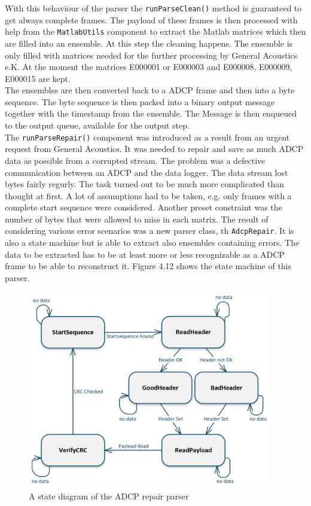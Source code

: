 With this behaviour of the parser the \texttt{runParseClean()} method is  guaranteed to get always complete frames. The payload of these frames is then processed with help from the \texttt{MatlabUtils} component to extract the Matlab matrices which then are filled into an ensemble. At this step the cleaning happens. The ensemble is only filled with matrices needed for the further processing by General Acoustics e.K. At the moment the matrices E000001 or E000003 and E000008, E000009, E000015 are kept.\\
The ensembles are then converted back to a ADCP frame and then into a byte sequence. The byte sequence is then packed into a binary output message together with the timestamp from the ensemble. The Message is then enqueued to the output queue, available for the output step.\\

The \texttt{runParseRepair()} component was introduced as a result from an urgent request from General Acoustics. It was needed to repair and save as much ADCP data as possible from a corrupted stream. The problem was a defective communication between an ADCP and the data logger. The data stream lost bytes fairly regurly.
The task turned out to be much more complicated than thought at first. A lot of assumptions had to be taken, e.g. only frames with a complete start sequence were considered. Another preset constraint was the number of bytes that were allowed to miss in each matrix. The result of considering various error scenarios was a new parser class, th \texttt{AdcpRepair}. It is also a state machine but is able to extract also ensembles containing errors. The data to be extracted has to be at least more or less recognizable as a ADCP frame to be able to reconstruct it. Figure 4.12 shows the state machine of this parser.\\

\begin{figure}[h]
\centering
      \includegraphics[width=0.95\textwidth]{repair}
        \caption{A state diagram of the ADCP repair parser}
\end{figure}


